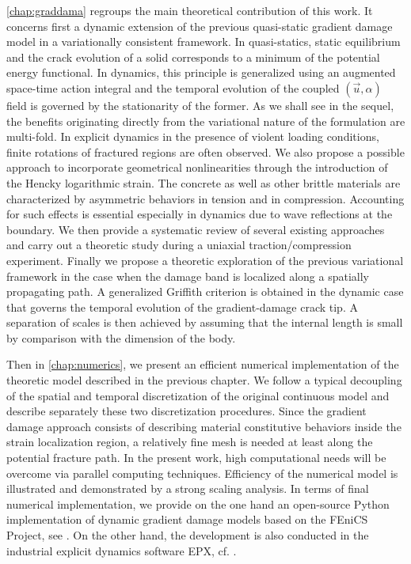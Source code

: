 \cref{chap:graddama} regroups the main theoretical contribution of this work. It concerns first a dynamic extension of the previous quasi-static gradient damage model in a variationally consistent framework. In quasi-statics, static equilibrium and the crack evolution of a solid corresponds to a minimum of the potential energy functional. In dynamics, this principle is generalized using an augmented space-time action integral and the temporal evolution of the coupled $(\vec{u},\alpha)$ field is governed by the stationarity of the former. As we shall see in the sequel, the benefits originating directly from the variational nature of the formulation are multi-fold. In explicit dynamics in the presence of violent loading conditions, finite rotations of fractured regions are often observed. We also propose a possible approach to incorporate geometrical nonlinearities through the introduction of the Hencky logarithmic strain. The concrete as well as other brittle materials are characterized by asymmetric behaviors in tension and in compression. Accounting for such effects is essential especially in dynamics due to wave reflections at the boundary. We then provide a systematic review of several existing approaches and carry out a theoretic study during a uniaxial traction/compression experiment. Finally we propose a theoretic exploration of the previous variational framework in the case when the damage band is localized along a spatially propagating path. A generalized Griffith criterion is obtained in the dynamic case that governs the temporal evolution of the gradient-damage crack tip. A separation of scales is then achieved by assuming that the internal length is small by comparison with the dimension of the body.

Then in \cref{chap:numerics}, we present an efficient numerical implementation of the theoretic model described in the previous chapter. We follow a typical decoupling of the spatial and temporal discretization of the original continuous model and describe separately these two discretization procedures. Since the gradient damage approach consists of describing material constitutive behaviors inside the strain localization region, a relatively fine mesh is needed at least along the potential fracture path. In the present work, high computational needs will be overcome via parallel computing techniques. Efficiency of the numerical model is illustrated and demonstrated by a strong scaling analysis. In terms of final numerical implementation, we provide on the one hand an open-source Python implementation of dynamic gradient damage models based on the FEniCS Project, see \cite{LiMaurini:2015}. On the other hand, the development is also conducted in the industrial explicit dynamics software EPX, cf. \cite{EPX:2015}.

